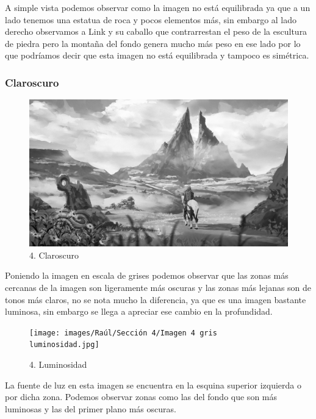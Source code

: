 \documentclass[12pt]{article}
\begin{document}
A simple vista podemos observar como la imagen no está equilibrada ya que a un lado tenemos una estatua de roca y pocos elementos más, sin embargo al lado derecho observamos a Link y su caballo que contrarrestan el peso de la escultura de piedra pero la montaña del fondo genera mucho más peso en ese lado por lo que podríamos decir que esta imagen no está equilibrada y tampoco es simétrica.

        \subsubsection{Claroscuro}

\begin{figure}[H]
      \centering
      \includegraphics[width=\textwidth]{images/Raúl/Sección 4/Imagen 4 gris.jpg}
      \caption{\small 4. Claroscuro}
\end{figure} 

Poniendo la imagen en escala de grises podemos observar que las zonas más cercanas de la imagen son ligeramente más oscuras y las zonas más lejanas son de tonos más claros, no se nota mucho la diferencia, ya que es una imagen bastante luminosa, sin embargo se llega a apreciar ese cambio en la profundidad.

\begin{figure}[H]
      \centering
      \texttt{[image: images/Raúl/Sección 4/Imagen 4 gris luminosidad.jpg]}
      \caption{\small 4. Luminosidad}
\end{figure}

La fuente de luz en esta imagen se encuentra en la esquina superior izquierda o por dicha zona. Podemos observar zonas como las del fondo que son más luminosas y las del primer plano más oscuras.
\end{document}
